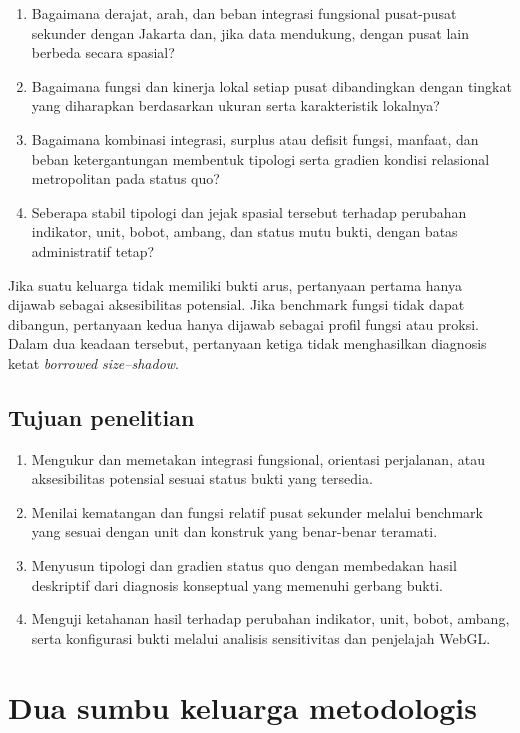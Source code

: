 \documentclass[10pt]{article}
\begin{document}
\begin{enumerate}
  \item Bagaimana derajat, arah, dan beban integrasi fungsional pusat-pusat sekunder dengan Jakarta dan, jika data mendukung, dengan pusat lain berbeda secara spasial?
  \item Bagaimana fungsi dan kinerja lokal setiap pusat dibandingkan dengan tingkat yang diharapkan berdasarkan ukuran serta karakteristik lokalnya?
  \item Bagaimana kombinasi integrasi, surplus atau defisit fungsi, manfaat, dan beban ketergantungan membentuk tipologi serta gradien kondisi relasional metropolitan pada status quo?
  \item Seberapa stabil tipologi dan jejak spasial tersebut terhadap perubahan indikator, unit, bobot, ambang, dan status mutu bukti, dengan batas administratif tetap?
\end{enumerate}

Jika suatu keluarga tidak memiliki bukti arus, pertanyaan pertama hanya dijawab sebagai aksesibilitas potensial. Jika benchmark fungsi tidak dapat dibangun, pertanyaan kedua hanya dijawab sebagai profil fungsi atau proksi. Dalam dua keadaan tersebut, pertanyaan ketiga tidak menghasilkan diagnosis ketat \textit{borrowed size--shadow}.

\subsection{Tujuan penelitian}

\begin{enumerate}
  \item Mengukur dan memetakan integrasi fungsional, orientasi perjalanan, atau aksesibilitas potensial sesuai status bukti yang tersedia.
  \item Menilai kematangan dan fungsi relatif pusat sekunder melalui benchmark yang sesuai dengan unit dan konstruk yang benar-benar teramati.
  \item Menyusun tipologi dan gradien status quo dengan membedakan hasil deskriptif dari diagnosis konseptual yang memenuhi gerbang bukti.
  \item Menguji ketahanan hasil terhadap perubahan indikator, unit, bobot, ambang, serta konfigurasi bukti melalui analisis sensitivitas dan penjelajah WebGL.
\end{enumerate}

\section{Dua sumbu keluarga metodologis}
\end{document}
